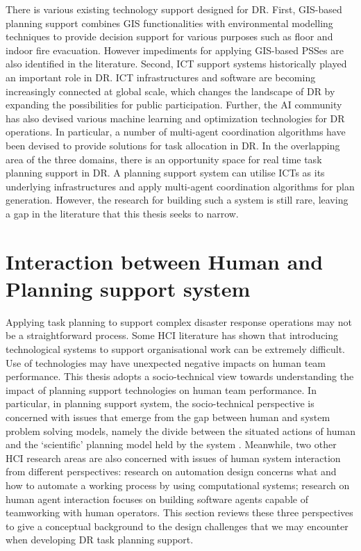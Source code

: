 There is various existing technology support designed for \ac{DR}. First, \ac{GIS}-based planning support combines \ac{GIS} functionalities with environmental modelling techniques to provide decision support for various purposes such as floor and indoor fire evacuation. However impediments for applying \ac{GIS}-based \ac{PSS}es are also identified in the literature. Second, \ac{ICT} support systems historically played an important role in \ac{DR}.  \ac{ICT} infrastructures and software are becoming increasingly connected at global scale, which changes the landscape of \ac{DR} by expanding the possibilities for public participation. Further, the \ac{AI} community has also devised various machine learning and optimization technologies for \ac{DR} operations. In particular, a number of multi-agent coordination algorithms have been devised to provide solutions for task allocation in \ac{DR}. In the overlapping area of the three domains, there is an opportunity space for real time task planning support in \ac{DR}. A planning support system can utilise \ac{ICT}s as its underlying infrastructures and apply multi-agent coordination algorithms for plan generation. However, the research for building such a system is still rare, leaving a gap in the literature that this thesis seeks to narrow.\\

\chapter{Interaction between Human and Planning support system}\label{ch:humanSysRelationship}

Applying task planning to support complex disaster response operations may not be a straightforward process. Some \ac{HCI} literature \citep{Ackerman2000,Bowers1994,Niazkhani2009} has shown that introducing technological systems to support organisational work can be extremely difficult. Use of technologies may have unexpected negative impacts on human team performance. This thesis adopts a socio-technical view towards understanding the impact of planning support technologies on human team performance. In particular, in planning support system, the socio-technical perspective is concerned with issues that emerge from the gap between human and system problem solving models, namely the divide between the situated actions of human and the `scientific' planning model held by the system \citep{Suchman1987}. Meanwhile, two other \ac{HCI} research areas are also concerned with issues of human system interaction from different perspectives: research on automation design concerns what and how to automate a working process by using computational systems; research on human agent interaction focuses on building software agents capable of teamworking with human operators. This section reviews these three perspectives to give a conceptual background to the design challenges that we may encounter when developing \ac{DR} task planning support.\\

